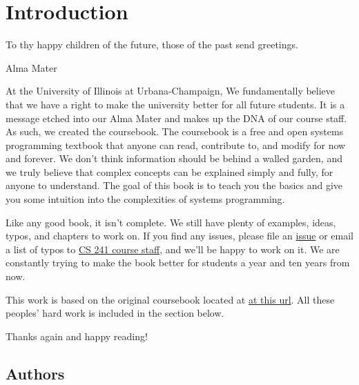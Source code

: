 \chapter{Introduction}

\epigraph{To thy happy children of the future, those of the past send greetings.}{Alma Mater}

At the University of Illinois at Urbana-Champaign, We fundamentally believe that we have a right to make the university better for all future students.
It is a message etched into our Alma Mater and makes up the DNA of our course staff.
As such, we created the coursebook.
The coursebook is a free and open systems programming textbook that anyone can read, contribute to, and modify for now and forever.
We don't think information should be behind a walled garden, and we truly believe that complex concepts can be explained simply and fully, for anyone to understand.
The goal of this book is to teach you the basics and give you some intuition into the complexities of systems programming.

Like any good book, it isn't complete.
We still have plenty of examples, ideas, typos, and chapters to work on.
If you find any issues, please file an \href{https://github.com/illinois-cs241/coursebook/issues}{issue} or email a list of typos to \href{http://cs241.cs.illinois.edu/staff}{CS 241 course staff}, and we'll be happy to work on it.
We are constantly trying to make the book better for students a year and ten years from now.

This work is based on the original coursebook located at \href{https://github.com/angrave/SystemProgramming/wiki}{at this url}.
All these peoples' hard work is included in the section below.

Thanks again and happy reading!

\section{Authors}




